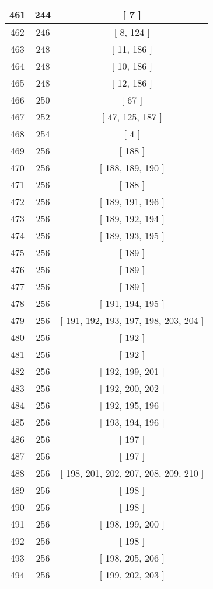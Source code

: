 \begin{center}
\begin{longtable}[H]{|| c c c ||}
\hline
461 & 244 & [ 7 ] \\ 
\hline
462 & 246 & [ 8, 124 ] \\ 
\hline
463 & 248 & [ 11, 186 ] \\ 
\hline
464 & 248 & [ 10, 186 ] \\ 
\hline
465 & 248 & [ 12, 186 ] \\ 
\hline
466 & 250 & [ 67 ] \\ 
\hline
467 & 252 & [ 47, 125, 187 ] \\ 
\hline
468 & 254 & [ 4 ] \\ 
\hline
469 & 256 & [ 188 ] \\ 
\hline
470 & 256 & [ 188, 189, 190 ] \\ 
\hline
471 & 256 & [ 188 ] \\ 
\hline
472 & 256 & [ 189, 191, 196 ] \\ 
\hline
473 & 256 & [ 189, 192, 194 ] \\ 
\hline
474 & 256 & [ 189, 193, 195 ] \\ 
\hline
475 & 256 & [ 189 ] \\ 
\hline
476 & 256 & [ 189 ] \\ 
\hline
477 & 256 & [ 189 ] \\ 
\hline
478 & 256 & [ 191, 194, 195 ] \\ 
\hline
479 & 256 & [ 191, 192, 193, 197, 198, 203, 204 ] \\ 
\hline
480 & 256 & [ 192 ] \\ 
\hline
481 & 256 & [ 192 ] \\ 
\hline
482 & 256 & [ 192, 199, 201 ] \\ 
\hline
483 & 256 & [ 192, 200, 202 ] \\ 
\hline
484 & 256 & [ 192, 195, 196 ] \\ 
\hline
485 & 256 & [ 193, 194, 196 ] \\ 
\hline
486 & 256 & [ 197 ] \\ 
\hline
487 & 256 & [ 197 ] \\ 
\hline
488 & 256 & [ 198, 201, 202, 207, 208, 209, 210 ] \\ 
\hline
489 & 256 & [ 198 ] \\ 
\hline
490 & 256 & [ 198 ] \\ 
\hline
491 & 256 & [ 198, 199, 200 ] \\ 
\hline
492 & 256 & [ 198 ] \\ 
\hline
493 & 256 & [ 198, 205, 206 ] \\ 
\hline
494 & 256 & [ 199, 202, 203 ] \\ 

\end{longtable}
\end{center}

